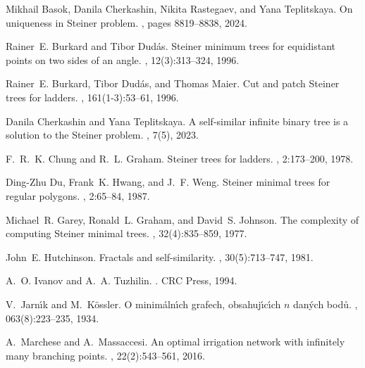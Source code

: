 \documentclass{amsart}
\theoremstyle{definition}
\theoremstyle{remark}
\begin{document}

%
\begin{thebibliography}{10}
  Mikhail Basok, Danila Cherkashin, Nikita Rastegaev, and Yana Teplitskaya.
  \newblock On uniqueness in {S}teiner problem.
  , pages 8819--8838, 2024.
  
  Rainer~E. Burkard and Tibor Dud{\'a}s.
  \newblock Steiner minimum trees for equidistant points on two sides of an angle.
  , 12(3):313--324, 1996.
  
  Rainer~E. Burkard, Tibor Dud{\'a}s, and Thomas Maier.
  \newblock Cut and patch {S}teiner trees for ladders.
  , 161(1-3):53--61, 1996.
  
  Danila Cherkashin and Yana Teplitskaya.
  \newblock A self-similar infinite binary tree is a solution to the {S}teiner problem.
  , 7(5), 2023.
  
  F.~R.~K. Chung and R.~L. Graham.
  \newblock Steiner trees for ladders.
  , 2:173--200, 1978.
  
  Ding-Zhu Du, Frank~K. Hwang, and J.~F. Weng.
  \newblock Steiner minimal trees for regular polygons.
  , 2:65--84, 1987.
  
  Michael~R. Garey, Ronald~L. Graham, and David~S. Johnson.
  \newblock The complexity of computing {S}teiner minimal trees.
  , 32(4):835--859, 1977.
  
  John~E. Hutchinson.
  \newblock Fractals and self-similarity.
  , 30(5):713--747, 1981.
  
  A.~O. Ivanov and A.~A. Tuzhilin.
  .
  \newblock CRC Press, 1994.
  
  V.~Jarn\'\i{}k and M.~K\"o{}ssler.
  \newblock O minim\'a{}ln\'\i{}ch grafech, obsahuj\'\i{}c\'\i{}ch $n$ dan\'y{}ch bod\r u{}.
  , 063(8):223--235, 1934.
  
  A.~Marchese and A.~Massaccesi.
  \newblock An optimal irrigation network with infinitely many branching points.
  , 22(2):543--561, 2016.
  

\end{thebibliography}
\end{document}
